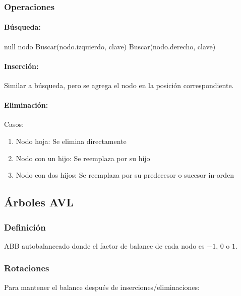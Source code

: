 \documentclass[12pt,a4paper]{article}
\begin{document}
\subsubsection{Operaciones}

\paragraph{Búsqueda:}
\begin{algorithm}[H]
\caption{Búsqueda en ABB}
\begin{algorithmic}
        \State \Return null
    \EndIf
        \State \Return nodo
        \State \Return Buscar(nodo.izquierdo, clave)
    \Else
        \State \Return Buscar(nodo.derecho, clave)
    \EndIf
\EndProcedure
\end{algorithmic}
\end{algorithm}

\paragraph{Inserción:}
Similar a búsqueda, pero se agrega el nodo en la posición correspondiente.

\paragraph{Eliminación:}
Casos:
\begin{enumerate}
    \item Nodo hoja: Se elimina directamente
    \item Nodo con un hijo: Se reemplaza por su hijo
    \item Nodo con dos hijos: Se reemplaza por su predecesor o sucesor in-orden
\end{enumerate}

\subsection{Árboles AVL}

\subsubsection{Definición}
ABB autobalanceado donde el factor de balance de cada nodo es $-1$, $0$ o $1$.

\subsubsection{Rotaciones}
Para mantener el balance después de inserciones/eliminaciones:
\end{document}
